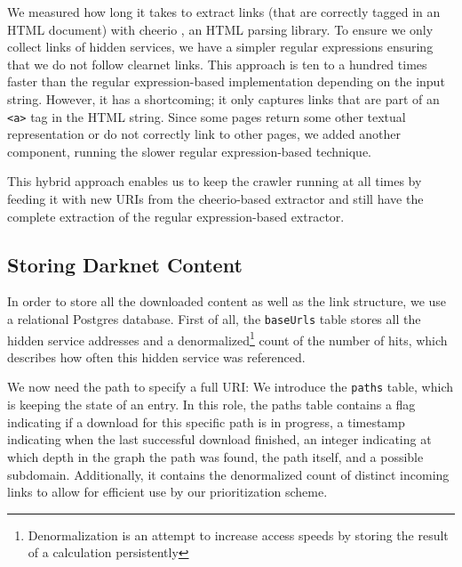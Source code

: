 \documentclass[USenglish,oneside,twocolumn]{article}
\begin{document}
We measured how long it takes to extract links (that are correctly tagged in an HTML document) with cheerio \cite{cheeriojs}, an HTML parsing library. To ensure we only collect links of hidden services, we have a simpler regular expressions ensuring that we do not follow clearnet links. This approach is ten to a hundred times faster than the regular expression-based implementation depending on the input string. However, it has a shortcoming; it only captures links that are part of an \texttt{<a>} tag in the HTML string. Since some pages return some other textual representation or do not correctly link to other pages, we added another component, running the slower regular expression-based technique.

This hybrid approach enables us to keep the crawler running at all times by feeding it with new URIs from the cheerio-based extractor and still have the complete extraction of the regular expression-based extractor.
%
%
\subsection{Storing Darknet Content}
In order to store all the downloaded content as well as the link structure, we use a relational Postgres database. First of all, the \texttt{baseUrls} table stores all the hidden service addresses and a denormalized\footnote{Denormalization is an attempt to increase access speeds by storing the result of a calculation persistently} count of the number of hits, which describes how often this hidden service was referenced.

We now need the path to specify a full URI: We introduce the \texttt{paths} table, which is keeping the state of an entry. In this role, the paths table contains a flag indicating if a download for this specific path is in progress, a timestamp indicating when the last successful download finished, an integer indicating at which depth in the graph the path was found, the path itself, and a possible subdomain. Additionally, it contains the denormalized count of distinct incoming links to allow for efficient use by our prioritization scheme.
\end{document}
